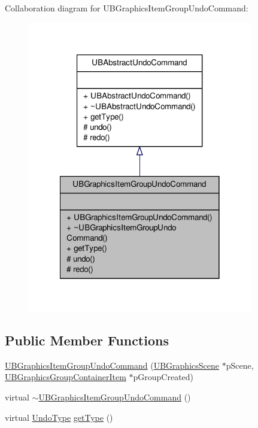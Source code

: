 Collaboration diagram for U\-B\-Graphics\-Item\-Group\-Undo\-Command\-:
\nopagebreak
\begin{figure}[H]
\begin{center}
\leavevmode
\includegraphics[width=278pt]{d1/d5a/class_u_b_graphics_item_group_undo_command__coll__graph}
\end{center}
\end{figure}
\subsection*{Public Member Functions}
\begin{DoxyCompactItemize}
\item 
\hyperlink{class_u_b_graphics_item_group_undo_command_a470d542151c011760c11b56928d4a855}{U\-B\-Graphics\-Item\-Group\-Undo\-Command} (\hyperlink{class_u_b_graphics_scene}{U\-B\-Graphics\-Scene} $\ast$p\-Scene, \hyperlink{class_u_b_graphics_group_container_item}{U\-B\-Graphics\-Group\-Container\-Item} $\ast$p\-Group\-Created)
\item 
virtual \hyperlink{class_u_b_graphics_item_group_undo_command_a3c077f78876aac6fd0324448821129c8}{$\sim$\-U\-B\-Graphics\-Item\-Group\-Undo\-Command} ()
\item 
virtual \hyperlink{class_u_b_abstract_undo_command_a85016029bd4ceb03a8247b3c01e2bd97}{Undo\-Type} \hyperlink{class_u_b_graphics_item_group_undo_command_ad0791a512824db2efc8656304b94aa3f}{get\-Type} ()
\end{DoxyCompactItemize}
